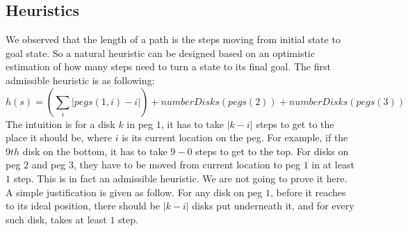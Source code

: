 \subsection{Heuristics}
We observed that the length of a path is the steps moving from initial state to goal state. So a natural heuristic can be designed based on an optimistic estimation of how many steps need to turn a state to its final goal. The first admissible heuristic is as following:
\[
h(s) = (\sum_i |pegs(1,i)-i| ) + numberDisks(pegs(2)) + numberDisks(pegs(3))
\]
The intuition is for a disk $k$ in peg $1$, it has to take $|k-i|$ steps to get to the place it should be, where $i$ is its current location on the peg. For example, if the $9th$ disk on the bottom, it has to take $9-0$ steps to get to the top. For disks on peg $2$ and peg $3$, they have to be moved from current location to peg $1$ in at least $1$ step. This is in fact an admissible heuristic. We are not going to prove it here. A simple justification is given as follow. For any disk on peg $1$, before it reaches to its ideal position, there should be $|k-i|$ disks put underneath it, and for every such disk, takes at least $1$ step. 



